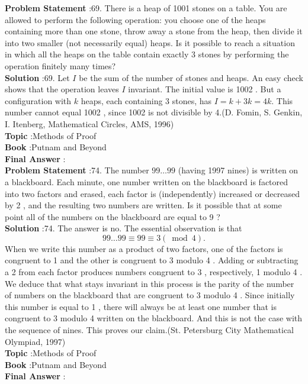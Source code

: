 \documentclass[10pt]{article}
\begin{document}
\textbf{Problem Statement} :69. There is a heap of 1001 stones on a table. You are allowed to perform the following operation: you choose one of the heaps containing more than one stone, throw away a stone from the heap, then divide it into two smaller (not necessarily equal) heaps. Is it possible to reach a situation in which all the heaps on the table contain exactly 3 stones by performing the operation finitely many times?\\
\textbf{Solution} :69. Let $I$ be the sum of the number of stones and heaps. An easy check shows that the operation leaves $I$ invariant. The initial value is 1002 . But a configuration with $k$ heaps, each containing 3 stones, has $I=k+3 k=4 k$. This number cannot equal 1002 , since 1002 is not divisible by 4.(D. Fomin, S. Genkin, I. Itenberg, Mathematical Circles, AMS, 1996)\\
\textbf{Topic} :Methods of Proof\\
\textbf{Book} :Putnam and Beyond\\
\textbf{Final Answer} :\\


\textbf{Problem Statement} :74. The number $99 \ldots 99$ (having 1997 nines) is written on a blackboard. Each minute, one number written on the blackboard is factored into two factors and erased, each factor is (independently) increased or decreased by 2 , and the resulting two numbers are written. Is it possible that at some point all of the numbers on the blackboard are equal to 9 ?\\
\textbf{Solution} :74. The answer is no. The essential observation is that$$ 99 \ldots 99 \equiv 99 \equiv 3(\bmod 4) . $$When we write this number as a product of two factors, one of the factors is congruent to 1 and the other is congruent to 3 modulo 4 . Adding or subtracting a 2 from each factor produces numbers congruent to 3 , respectively, 1 modulo 4 . We deduce that what stays invariant in this process is the parity of the number of numbers on the blackboard that are congruent to 3 modulo 4 . Since initially this number is equal to 1 , there will always be at least one number that is congruent to 3 modulo 4 written on the blackboard. And this is not the case with the sequence of nines. This proves our claim.(St. Petersburg City Mathematical Olympiad, 1997)\\
\textbf{Topic} :Methods of Proof\\
\textbf{Book} :Putnam and Beyond\\
\textbf{Final Answer} :\\
\end{document}
